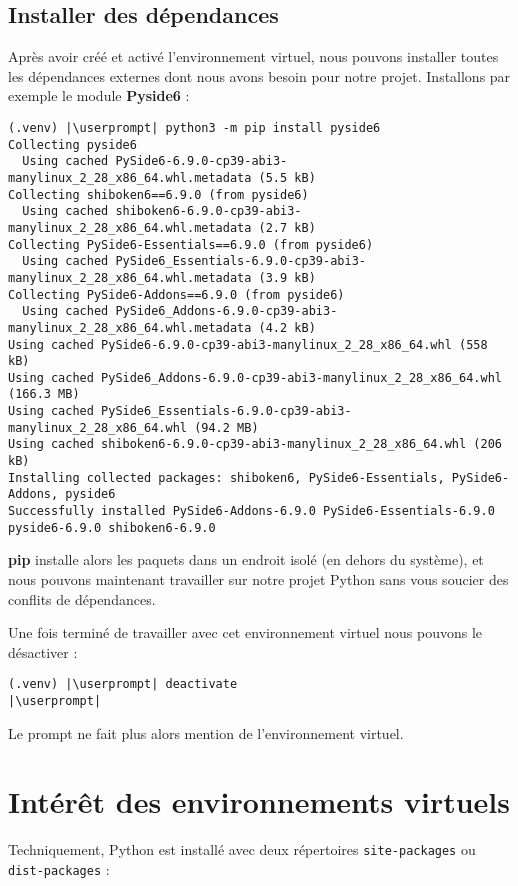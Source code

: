\subsection*{Installer des dépendances}
Après avoir créé et activé l'environnement virtuel, nous pouvons installer toutes les dépendances externes dont nous avons besoin pour notre projet. Installons par exemple le module \textbf{Pyside6} :
\begin{lstlisting}[style=bash]
(.venv) |\userprompt| python3 -m pip install pyside6
Collecting pyside6
  Using cached PySide6-6.9.0-cp39-abi3-manylinux_2_28_x86_64.whl.metadata (5.5 kB)
Collecting shiboken6==6.9.0 (from pyside6)
  Using cached shiboken6-6.9.0-cp39-abi3-manylinux_2_28_x86_64.whl.metadata (2.7 kB)
Collecting PySide6-Essentials==6.9.0 (from pyside6)
  Using cached PySide6_Essentials-6.9.0-cp39-abi3-manylinux_2_28_x86_64.whl.metadata (3.9 kB)
Collecting PySide6-Addons==6.9.0 (from pyside6)
  Using cached PySide6_Addons-6.9.0-cp39-abi3-manylinux_2_28_x86_64.whl.metadata (4.2 kB)
Using cached PySide6-6.9.0-cp39-abi3-manylinux_2_28_x86_64.whl (558 kB)
Using cached PySide6_Addons-6.9.0-cp39-abi3-manylinux_2_28_x86_64.whl (166.3 MB)
Using cached PySide6_Essentials-6.9.0-cp39-abi3-manylinux_2_28_x86_64.whl (94.2 MB)
Using cached shiboken6-6.9.0-cp39-abi3-manylinux_2_28_x86_64.whl (206 kB)
Installing collected packages: shiboken6, PySide6-Essentials, PySide6-Addons, pyside6
Successfully installed PySide6-Addons-6.9.0 PySide6-Essentials-6.9.0 pyside6-6.9.0 shiboken6-6.9.0
\end{lstlisting}

\textbf{pip} installe alors les paquets dans un endroit isolé (en dehors du système), et nous pouvons maintenant travailler sur notre projet Python sans vous soucier des conflits de dépendances.

Une fois terminé de travailler avec cet environnement virtuel nous pouvons le désactiver :
\begin{lstlisting}[style=bash]
(.venv) |\userprompt| deactivate
|\userprompt|
\end{lstlisting}

Le prompt ne fait plus alors mention de l'environnement virtuel.

\section{Intérêt des environnements virtuels}
Techniquement, Python est installé avec deux répertoires \texttt{site-packages} ou \\
\texttt{dist-packages} :

